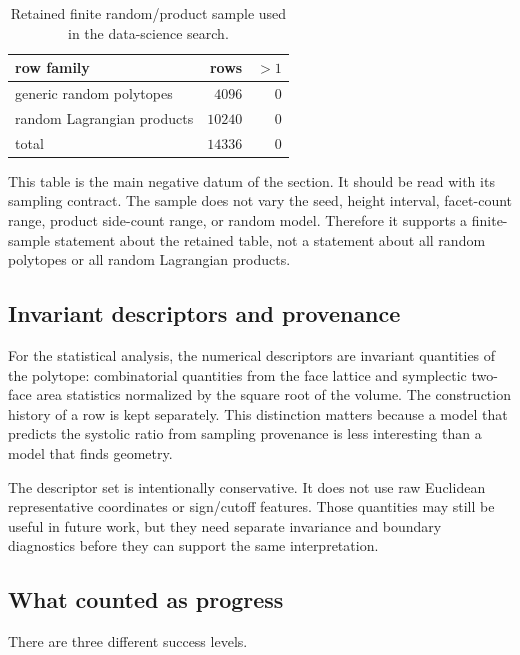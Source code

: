 \begin{table}[htbp]
\centering
\begin{tabular}{lrr}
\toprule
row family & rows & \(>1\)\\
\midrule
generic random polytopes & \(4096\) & \(0\)\\
random Lagrangian products & \(10240\) & \(0\)\\
\midrule
total & \(14336\) & \(0\)\\
\bottomrule
\end{tabular}
\caption{Retained finite random/product sample used in the data-science search.}
\label{tab:black-box-datascience-retained-sample}
\end{table}

This table is the main negative datum of the section.  It should be read with
its sampling contract.  The sample does not vary the seed, height interval,
facet-count range, product side-count range, or random model.  Therefore it
supports a finite-sample statement about the retained table, not a statement
about all random polytopes or all random Lagrangian products.

\subsection{Invariant descriptors and provenance}
\label{subsec:black-box-datascience-invariant-features-and-provenance}

For the statistical analysis, the numerical descriptors are invariant
quantities of the polytope: combinatorial quantities from the face lattice and
symplectic two-face area statistics normalized by the square root of the volume.
The construction history of a row is kept separately.  This distinction matters
because a model that predicts the systolic ratio from sampling provenance is
less interesting than a model that finds geometry.

The descriptor set is intentionally conservative.  It does not use raw
Euclidean representative coordinates or sign/cutoff features.  Those quantities
may still be useful in future work, but they need separate invariance and
boundary diagnostics before they can support the same interpretation.

\subsection{What counted as progress}
\label{subsec:black-box-datascience-result-types}

There are three different success levels.


